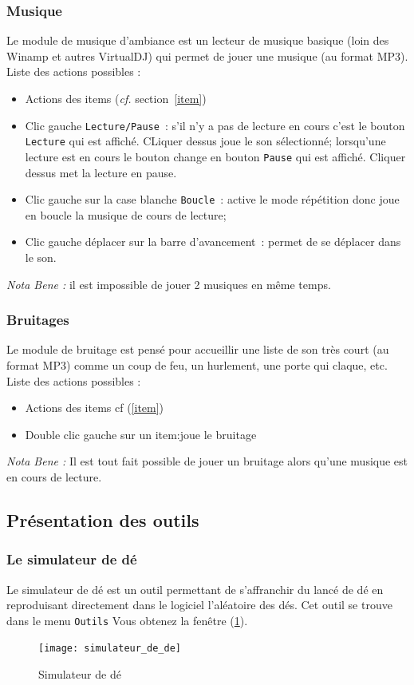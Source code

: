 \documentclass[a4paper,12pt]{article}
\newcommand*{\interfaceitem}[1]{\texttt{#1}}
\begin{document}
\subsubsection{Musique}\label{musique}
Le module de musique d'ambiance est un lecteur de musique basique (loin des Winamp et autres VirtualDJ) qui permet de jouer une musique (au format MP3).
\\
Liste des actions possibles :
\begin{itemize}
    \item Actions des items (\emph{cf.} section~\ref{item})
    \item Clic gauche \interfaceitem{Lecture/Pause}~: s'il n'y a pas de lecture en cours c'est le bouton \interfaceitem{Lecture} qui est affiché. CLiquer dessus joue le son sélectionné; lorsqu'une lecture est en cours le bouton change en bouton \interfaceitem{Pause} qui est affiché. Cliquer dessus met la lecture en pause.
    \item Clic gauche sur la case blanche \interfaceitem{Boucle}~: active le mode répétition donc joue en boucle la musique de cours de lecture;
    \item Clic gauche déplacer sur la barre d'avancement~: permet de se déplacer dans le son.
\end{itemize}
\emph{Nota Bene :} il est impossible de jouer 2 musiques en même temps.

\subsubsection{Bruitages}\label{bruitage}
Le module de bruitage est pensé pour accueillir une liste de son très court (au format MP3) comme un coup de feu, un hurlement, une porte qui claque, etc.
\\
Liste des actions possibles :
\begin{itemize}
    \item Actions des items cf (\ref{item})
    \item Double clic gauche sur un item:joue le bruitage
\end{itemize}

\emph{Nota Bene :} Il est tout fait possible de jouer un bruitage alors qu'une musique est en cours de lecture.

\subsection{Présentation des outils}

\subsubsection{Le simulateur de dé}
Le simulateur de dé est un outil permettant de s'affranchir du lancé de dé en reproduisant directement dans le logiciel l'aléatoire des dés.
Cet outil se trouve dans le menu \interfaceitem{Outils}
Vous obtenez la fenêtre (\ref{simulateur_de}).
\begin{figure}[h]
    \texttt{[image: simulateur\_de\_de]}
    \caption{Simulateur de dé}
    \label{simulateur_de}
\end{figure}
\end{document}
